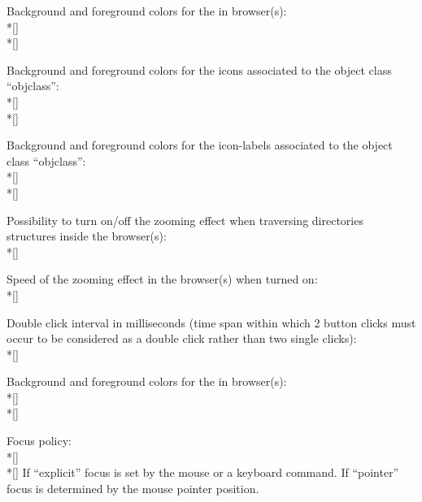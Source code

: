 \begin{UL}
Background and foreground colors for the \OW{} in browser(s):
\\*[\smallskipamount]\mbox{}
\\*[\smallskipamount]\mbox{}
\item
Background and foreground colors for the icons associated to the object
class ``objclass'':
\\*[\smallskipamount]\mbox{} 
\\*[\smallskipamount]\mbox{} 
\item
Background and foreground colors for the icon-labels associated to the object
class ``objclass'':
\\*[\smallskipamount]\mbox{}
\\*[\smallskipamount]\mbox{}
\item
Possibility to turn on/off the zooming effect when traversing directories
structures inside the browser(s):
\\*[\smallskipamount]\mbox{}
\item
Speed of the zooming effect in the browser(s) when turned on:
\\*[\smallskipamount]\mbox{}
\item
Double click interval in milliseconds (time span within which 2 button clicks
must occur to be considered as a double click rather than two single clicks):
\\*[\smallskipamount]\mbox{}
\item
Background and foreground colors for the \BW{} in browser(s):
\\*[\smallskipamount]\mbox{}
\\*[\smallskipamount]\mbox{}
\item
Focus policy:
\\*[\smallskipamount]\mbox{}\\*[\smallskipamount]
If ``explicit'' focus is set by the mouse or a keyboard command. If ``pointer''
focus is determined by the mouse pointer position.
\end{UL}

